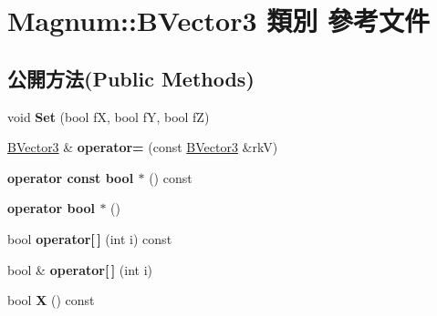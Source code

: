 \hypertarget{class_magnum_1_1_b_vector3}{}\section{Magnum\+:\+:B\+Vector3 類別 參考文件}
\label{class_magnum_1_1_b_vector3}
\subsection*{公開方法(Public Methods)}
\begin{DoxyCompactItemize}
\item 
void {\bfseries Set} (bool fX, bool fY, bool fZ)\hypertarget{class_magnum_1_1_b_vector3_af2180b4277d09392f29c1d724f2630a5}{}\label{class_magnum_1_1_b_vector3_af2180b4277d09392f29c1d724f2630a5}

\item 
\hyperlink{class_magnum_1_1_b_vector3}{B\+Vector3} \& {\bfseries operator=} (const \hyperlink{class_magnum_1_1_b_vector3}{B\+Vector3} \&rkV)\hypertarget{class_magnum_1_1_b_vector3_ad79474f59b0b47b2a20a3061ae70a503}{}\label{class_magnum_1_1_b_vector3_ad79474f59b0b47b2a20a3061ae70a503}

\item 
{\bfseries operator const bool $\ast$} () const \hypertarget{class_magnum_1_1_b_vector3_a09ede2864f5184680a8f392ca562741c}{}\label{class_magnum_1_1_b_vector3_a09ede2864f5184680a8f392ca562741c}

\item 
{\bfseries operator bool $\ast$} ()\hypertarget{class_magnum_1_1_b_vector3_a7d1efd8de78bf44807b64a5174cb3775}{}\label{class_magnum_1_1_b_vector3_a7d1efd8de78bf44807b64a5174cb3775}

\item 
bool {\bfseries operator\mbox{[}$\,$\mbox{]}} (int i) const \hypertarget{class_magnum_1_1_b_vector3_a9f10419225b77fa1ab7813e3abc6d443}{}\label{class_magnum_1_1_b_vector3_a9f10419225b77fa1ab7813e3abc6d443}

\item 
bool \& {\bfseries operator\mbox{[}$\,$\mbox{]}} (int i)\hypertarget{class_magnum_1_1_b_vector3_ab91dd0727a8bff43b3c27fd6d07ac2ea}{}\label{class_magnum_1_1_b_vector3_ab91dd0727a8bff43b3c27fd6d07ac2ea}

\item 
bool {\bfseries X} () const \hypertarget{class_magnum_1_1_b_vector3_ab34842274e6b6779a3499bf3dc638f4c}{}\label{class_magnum_1_1_b_vector3_ab34842274e6b6779a3499bf3dc638f4c}


\end{DoxyCompactItemize}
